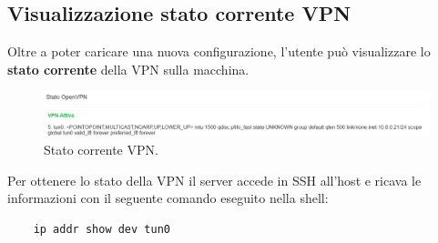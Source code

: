 \subsection{Visualizzazione stato corrente VPN}

Oltre a poter caricare una nuova configurazione, l'utente può visualizzare lo \textbf{stato corrente} della VPN sulla macchina.

\begin{figure}[H]
    \begin{center}
    \includegraphics[width=\textwidth]{images/vpn-status.png}
    \caption{Stato corrente VPN.}
    \end{center}
\end{figure}

Per ottenere lo stato della VPN il server accede in SSH all'host e ricava le informazioni con il seguente comando eseguito nella shell:

\begin{verbatim}
    ip addr show dev tun0
\end{verbatim}